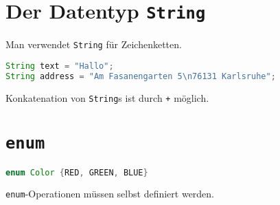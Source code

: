 \section{Der Datentyp \texttt{String}}
Man verwendet \texttt{String} für Zeichenketten.
\begin{lstlisting}[language=Java]
String text = "Hallo";
String address = "Am Fasanengarten 5\n76131 Karlsruhe";
\end{lstlisting}
\begin{remark}
  Konkatenation von \texttt{String}s ist durch \texttt{+} möglich.
\end{remark}

\section{\texttt{enum}}
\begin{lstlisting}[language=Java]
enum Color {RED, GREEN, BLUE}
\end{lstlisting}
\begin{remark}
  \texttt{enum}-Operationen müssen selbst definiert werden.
\end{remark}